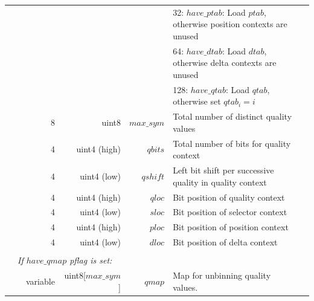 \documentclass[a4paper]{article}
\begin{document}
\begin{table}[H]
\begin{tabular}{|r|r|r|r|r|p{8cm}|l|l|}
                       & \multicolumn{2}{r|}{}         &                &                                & \multicolumn{2}{p{8.4cm}|}{32: $have\_ptab$: Load $ptab$, otherwise position contexts are unused} & \\
                       & \multicolumn{2}{r|}{}         &                &                                & \multicolumn{2}{p{8.4cm}|}{64: $have\_dtab$: Load $dtab$, otherwise delta contexts are unused} & \\
                       & \multicolumn{2}{r|}{}         &                &                                & \multicolumn{2}{p{8.4cm}|}{128: $have\_qtab$: Load $qtab$, otherwise set $qtab_i = i$} &\\
\cline{2-7}
                       & \multicolumn{2}{r|}{8}        & uint8          & $max\_sym$                     & \multicolumn{2}{p{8.4cm}|}{Total number of distinct quality values} & \\
\cline{2-7}
                       & \multicolumn{2}{r|}{4}        & uint4 (high)   & $qbits$                        & \multicolumn{2}{p{8.4cm}|}{Total number of bits for quality context} & \\
                       & \multicolumn{2}{r|}{4}        & uint4 (low)    & $qshift$                       & \multicolumn{2}{p{8.4cm}|}{Left bit shift per successive quality in quality context} & \\
                       & \multicolumn{2}{r|}{4}        & uint4 (high)   & $qloc$                         & \multicolumn{2}{p{8.4cm}|}{Bit position of quality context} & \\
                       & \multicolumn{2}{r|}{4}        & uint4 (low)    & $sloc$                         & \multicolumn{2}{p{8.4cm}|}{Bit position of selector context} & \\
                       & \multicolumn{2}{r|}{4}        & uint4 (high)   & $ploc$                         & \multicolumn{2}{p{8.4cm}|}{Bit position of position context} & \\
                       & \multicolumn{2}{r|}{4}        & uint4 (low)    & $dloc$                         & \multicolumn{2}{p{8.4cm}|}{Bit position of delta context }& \\
\cline{2-7}

& \multicolumn{6}{l|}{} & \\[-0.7em]
\multicolumn{1}{|l|}{} & \multicolumn{6}{l|}{ \textit{If $have\_qmap$ pflag is set:} } & \\
\cline{3-6}
                       &  & variable                   & uint8[$max\_sym$]          & $qmap$             & Map for unbinning quality values. & & \\
\cline{3-6}


\end{tabular}
\end{table}
\end{document}
